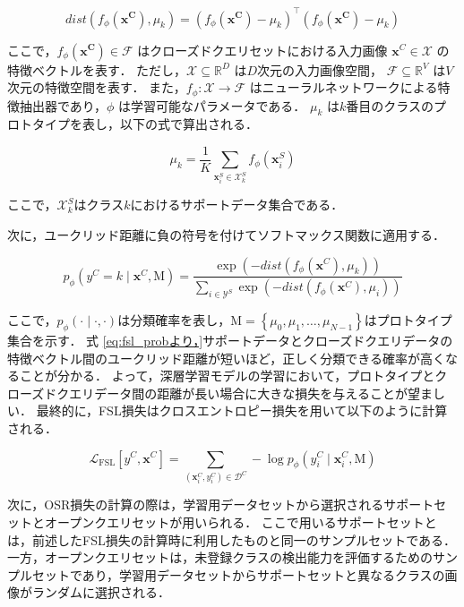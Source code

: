 \documentclass[a4paper,11pt,nomag]{jsreport}
\begin{document}
\begin{equation}
  dist(f_{\phi}(\bm{x^C}),\mu_{k})=(f_{\phi}(\bm{x^C}) - \mu_{k})^{\top} (f_{\phi}(\bm{x^C}) - \mu_{k})
\end{equation}

\noindent
ここで，$f_{\phi}(\bm{x^C}) \in \mathcal{F}$ はクローズドクエリセットにおける入力画像 $\bm{x}^C \in \mathcal{X}$ の特徴ベクトルを表す．
ただし，$\mathcal{X} \subseteq \mathbb{R}^D$ は$D$次元の入力画像空間， $\mathcal{F} \subseteq \mathbb{R}^V$ は$V$次元の特徴空間を表す．
また，$f_{\phi}: \mathcal{X} \rightarrow \mathcal{F}$ はニューラルネットワークによる特徴抽出器であり，$\phi$ は学習可能なパラメータである．
$\mu_{k}$ は$k$番目のクラスのプロトタイプを表し，以下の式で算出される．

\begin{equation}
  \mu_{k} = \frac{1}{K} \sum_{\bm{x}^S_i \in \mathcal{X}^S_k} {f_\phi(\bm{x}^S_i)}
\end{equation}

\noindent
ここで，$\mathcal{X}^S_k$はクラス$k$におけるサポートデータ集合である．

次に，ユークリッド距離に負の符号を付けてソフトマックス関数に適用する．

\begin{equation}
\label{eq:fsl_prob}
  p_{\phi}(y^C=k \mid \bm{x}^C, \mathrm{M}) 
              = \frac{\exp(-dist(f_\phi(\bm{x}^C),\mu_{k}))}{\sum_{i \in \mathcal{Y}^S} {\exp(-dist(f_\phi(\bm{x}^C),\mu_{i}))}}
\end{equation}

\noindent
ここで，$p_{\phi}(\cdot \mid \cdot, \cdot)$は分類確率を表し，$\mathrm{M} = \left\{\mu_0, \mu_1, \ldots, \mu_{N-1} \right\}$はプロトタイプ集合を示す．
式 \ref{eq:fsl_probより，}サポートデータとクローズドクエリデータの特徴ベクトル間のユークリッド距離が短いほど，正しく分類できる確率が高くなることが分かる．
よって，深層学習モデルの学習において，プロトタイプとクローズドクエリデータ間の距離が長い場合に大きな損失を与えることが望ましい．
最終的に，FSL損失はクロスエントロピー損失を用いて以下のように計算される．

\begin{equation}
  \mathcal{L}_{\mathrm{FSL}} [y^C, \bm{x}^C] = \sum_{(\bm{x}^C_i,y^C_i) \in \mathcal{D}^C} - \log {p_{\phi} (y^C_i \mid \bm{x}^C_i, \mathrm{M})}
\end{equation}

次に，OSR損失の計算の際は，学習用データセットから選択されるサポートセットとオープンクエリセットが用いられる．
ここで用いるサポートセットとは，前述したFSL損失の計算時に利用したものと同一のサンプルセットである．
一方，オープンクエリセットは，未登録クラスの検出能力を評価するためのサンプルセットであり，学習用データセットからサポートセットと異なるクラスの画像がランダムに選択される．
\end{document}
